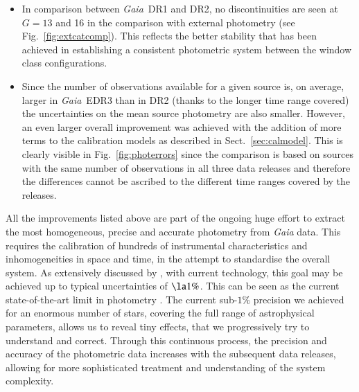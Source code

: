 \documentclass{aa}
\newcommand{\gaia}{\textit{Gaia}\xspace}
\newcommand{\dro}{\gaia~DR1\xspace}
\newcommand{\edr}{\gaia~EDR3\xspace}
\newcommand{\secname}{Sect.}
\newcommand{\secref}[1]{\secname~\ref{sec:#1}}
\newcommand{\figref}[1]{Fig.~\ref{fig:#1}}
\begin{document}
\begin{itemize}
    \item In comparison between \dro and DR2, no discontinuities are seen at $G=13$ and 16 in the comparison with external photometry (see \figref{extcatcomp}). This reflects the better stability that has been achieved in establishing a consistent photometric system between the window class configurations.
    \item
    Since the number of observations available for a given source is, on average, larger in \edr than in DR2 (thanks to the longer time range covered) the uncertainties on the mean source photometry are also smaller. However, an even larger overall improvement was achieved with the addition of more terms to the calibration models as described in \secref{calmodel}. This is clearly visible in \figref{photerrors} since the comparison is based on sources with the same number of observations in all three data releases and therefore the differences cannot be ascribed to the different time ranges covered by the releases.
\end{itemize}

All the improvements listed above are part of the ongoing huge effort to extract the most homogeneous, precise and accurate photometry from \gaia data. This requires the calibration of hundreds of instrumental characteristics and inhomogeneities in space and time, in the attempt to standardise the overall system. 
As extensively discussed by \citet{clem13}, with current technology, this goal may be achieved up to typical uncertainties of $\la 1\%$. This can be seen as the current state-of-the-art limit in photometry \citep[see also][for recent, large-scale examples]{Ive07,APASS2020}. The current sub-$1\%$ precision we achieved for an enormous number of stars, covering the full range of astrophysical parameters, allows us to reveal tiny effects, that we progressively try to understand and correct. Through this continuous process, the precision and accuracy of the photometric data increases with the subsequent data releases, allowing for more sophisticated treatment and understanding of the system complexity.

\end{document}
